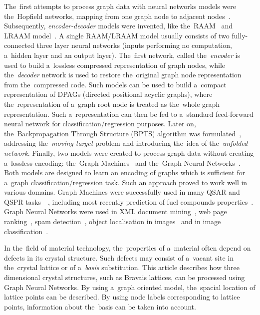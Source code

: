\documentclass{llncs}
\begin{document}
The~first attempts to process graph data with neural networks models were the~Hopfield networks, mapping from one graph node to adjacent nodes~\cite{goulon2005hopfield}. Subsequently, \emph{encoder-decoder} models were invented, like the~RAAM~\cite{pollack1990recursive} and LRAAM model~\cite{sperduti1994labelling}. A single RAAM/LRAAM model usually consists of two fully-connected three layer neural networks (inputs performing no computation, a~hidden layer and an output layer). The~first network, called the~\emph{encoder} is used to build a~lossless compressed representation of graph nodes, while the~\emph{decoder} network is used to restore the~original graph node representation from the~compressed code. Such models can be used to build a~compact representation of DPAGs (directed positional acyclic graphs), where the~representation of a~graph root node is treated as the~whole graph representation. Such a~representation can then be fed to a~standard feed-forward neural network for classification/regression purposes. Later on, the~Backpropagation Through Structure (BPTS) algorithm was formulated~\cite{goller1996learning}, addressing the~\emph{moving target} problem and introducing the~idea of the~\emph{unfolded network}. Finally, two models were created to process graph data without creating a~lossless encoding: the~Graph Machines~\cite{goulon2005learning} and the~Graph Neural Networks~\cite{scarselli2009graph}. Both models are designed to learn an encoding of graphs which is sufficient for a~graph classification/regression task. Such an approach proved to work well in various domains. Graph Machines were successfully used in many QSAR and QSPR tasks~\cite{goulon2007predicting}~\cite{goulon2011novel}, including most recently prediction of fuel compounds properties~\cite{saldana2013rational}. Graph Neural Networks were used in XML document mining~\cite{yong2006xml}, web page ranking~\cite{scarselli2005graph}, spam detection~\cite{scarselli2013solving}, object localisation in images~\cite{monfardini2006graph} and in image classification~\cite{quek2011structural}.

In the~field of material technology, the~properties of a~material often depend on defects in its crystal structure. Such defects may consist of a~vacant site in the~crystal lattice or of a~\emph{basis} substitution.
This article describes how three dimensional crystal structures, such as Bravais lattices, can be processed using Graph Neural Networks. By using a~graph oriented model, the~spacial location of lattice points can be described. By using node labels corresponding to lattice points, information about the~basis can be taken into account.
\end{document}
